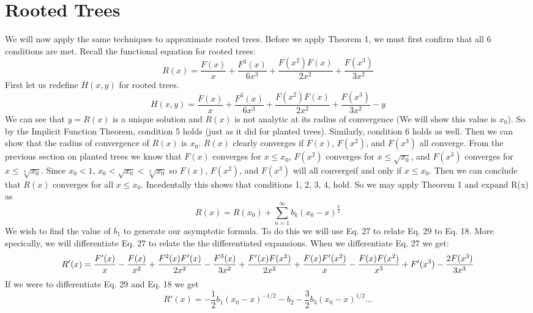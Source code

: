 \documentclass{article}
\begin{document}
\section{Rooted Trees}
We will now apply the same techniques to approximate rooted trees. Before we apply Theorem 1, we must first confirm that all 6 conditions are met. Recall the functional equation for rooted trees:
\begin{equation}
R(x)=\frac{F(x)}{x} +\frac{F^3(x)}{6x^3}+\frac{F(x^2)F(x)}{2x^2}+\frac{F(x^3)}{3x^2}
\end{equation}
First let us redefine \(H(x,y)\) for rooted trees. 
\begin{equation}
H(x,y)= \frac{F(x)}{x} +\frac{F^3(x)}{6x^3}+\frac{F(x^2)F(x)}{2x^2}+\frac{F(x^3)}{3x^2} -y
\end{equation}
We can see that \(y=R(x)\) is a unique solution and \(R(x)\) is not analytic at its radius of convergence (We will show this value is \(x_0\)). So by the Implicit Function Theorem, condition 5 holds (just as it did for planted trees). Similarly, condition 6 holds as well. 
Then we can show that the radius of convergence of \(R(x)\) is \(x_0\). \(R(x)\) clearly converges if \(F(x)\), \(F(x^2)\), and \(F(x^3)\) all converge. From the previous section on planted trees we know that \(F(x)\) converges for \(x \leq x_0\),  \(F(x^2)\) converges for \(x \leq \sqrt{x_0}\), and  \(F(x^3)\) converges for \(x \leq \sqrt[3]{x_0}\). Since \(x_0 < 1\),  \(x_0 < \sqrt{x_0}<\sqrt[3]{x_0}\) so \(F(x)\), \(F(x^2)\), and \(F(x^3)\) will all convergeif and only if \(x \leq x_0\). Then we can conclude that \(R(x)\) converges for all \(x \leq x_0\). Incedentally this shows that conditions 1, 2, 3, 4, hold. 
	So we may apply Theorem 1 and expand R(x) as 
\begin{equation}
R(x)=R(x_0)+\sum_{n=1}^\infty b_k(x_0-x)^{\frac{k}{2}}
\end{equation}
	We wish to find the value of \(b_1\) to generate our asymptotic formula. To do this we will use Eq. 27 to relate Eq. 29 to Eq. 18. More specically, we will differentiate Eq. 27  to relate the the differentiated expansions. When we differentiate Eq. 27 we get:
\begin{equation}
\small
R'(x)=\frac{F'(x)}{x}-\frac{F(x)}{x^2}+\frac{F^2(x)F'(x)}{2x^2}-\frac{F^3(x)}{3x^2}+\frac{F'(x)F(x^2)}{2x^2}+\frac{F(x)F'(x^2)}{x}-\frac{F(x)F(x^2)}{x^3}+F'(x^3)-\frac{2F(x^3)}{3x^3}
\end{equation}
 If we were to differentiate Eq. 29 and Eq. 18 we get 
\begin{equation}
R'(x)= -\frac{1}{2}b_1(x_0-x)^{-1/2}-b_2-\frac{3}{2}b_3(x_0-x)^{1/2}...
\end{equation}
\end{document}
